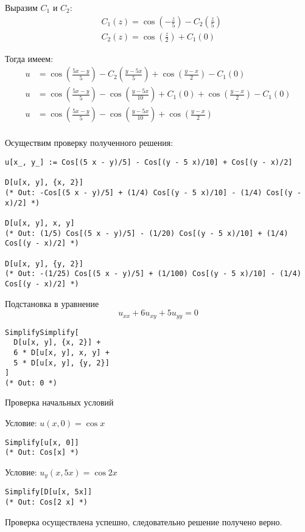 \documentclass[a4paper,12pt]{article}
\begin{document}
Выразим $C_1$ и $C_2$:
\begin{align*}
    &C_1(z)=\cos (-\frac{z}{5}) - C_2(\frac{z}{5})\\
    &C_2(z) = \cos (\frac{z}{2}) + C_1(0)
\end{align*}

Тогда имеем:
\begin{align*}
    u &=\cos (\frac{5x-y}{5}) - C_2(\frac{y-5x}{5}) + \cos (\frac{y-x}{2}) - C_1(0)\\
    u &=\cos (\frac{5x-y}{5}) - \cos (\frac{y-5x}{10}) +C_1(0) + \cos (\frac{y-x}{2}) - C_1(0)\\
    u &=\cos (\frac{5x-y}{5}) - \cos (\frac{y-5x}{10}) + \cos (\frac{y-x}{2}) \\
\end{align*}

Осуществим проверку полученного решения:
\begin{lstlisting}[style=wolfram]
u[x_, y_] := Cos[(5 x - y)/5] - Cos[(y - 5 x)/10] + Cos[(y - x)/2]

D[u[x, y], {x, 2}]
(* Out: -Cos[(5 x - y)/5] + (1/4) Cos[(y - 5 x)/10] - (1/4) Cos[(y - x)/2] *)

D[u[x, y], x, y]
(* Out: (1/5) Cos[(5 x - y)/5] - (1/20) Cos[(y - 5 x)/10] + (1/4) Cos[(y - x)/2] *)

D[u[x, y], {y, 2}]
(* Out: -(1/25) Cos[(5 x - y)/5] + (1/100) Cos[(y - 5 x)/10] - (1/4) Cos[(y - x)/2] *)
\end{lstlisting}

Подстановка в уравнение
\[
u_{xx} + 6 u_{xy} + 5u_{yy} = 0
\]

\begin{lstlisting}[style=wolfram]
SimplifySimplify[
  D[u[x, y], {x, 2}] +
  6 * D[u[x, y], x, y] +
  5 * D[u[x, y], {y, 2}]
]
(* Out: 0 *)
\end{lstlisting}

Проверка начальных условий

Условие: \( u(x, 0) = \cos x \)

\begin{lstlisting}[style=wolfram]
Simplify[u[x, 0]]
(* Out: Cos[x] *)
\end{lstlisting}

Условие: \( u_y(x, 5x) = \cos 2x \)

\begin{lstlisting}[style=wolfram]
Simplify[D[u[x, 5x]]
(* Out: Cos[2 x] *)
\end{lstlisting}

Проверка осуществлена успешно, следовательно решение получено верно.
\end{document}
